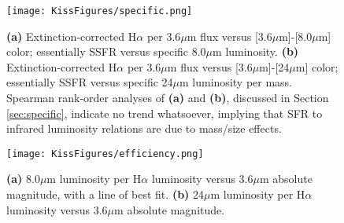 \begin{figure}%
\begin{center}
   \texttt{[image: KissFigures/specific.png]}
   \label{sfr_36micron_ir_36micron}

  \caption{
   {\bf (a)} Extinction-corrected H$\alpha$ per 3.6$\mu$m flux versus [3.6$\mu$m]-[8.0$\mu$m] color; essentially SSFR versus specific 8.0$\mu$m luminosity. 
   {\bf (b)} Extinction-corrected H$\alpha$ per 3.6$\mu$m flux versus [3.6$\mu$m]-[24$\mu$m] color; essentially SSFR versus specific 24$\mu$m luminosity per mass. Spearman rank-order analyses of {\bf(a)} and {\bf(b)}, discussed in Section \ref{sec:specific}, indicate no trend whatsoever, implying that SFR to infrared luminosity relations are due to mass/size effects.}


\label{sfr_36micron_ir_36micron}
\end{center}
\end{figure}

\begin{figure}%
\begin{center}
  \texttt{[image: KissFigures/efficiency.png]}
  \caption{
   {\bf (a)} 8.0$\mu$m luminosity per H$\alpha$ luminosity versus 3.6$\mu$m absolute magnitude, with a line of best fit.
   {\bf (b)} 24$\mu$m luminosity per H$\alpha$ luminosity versus 3.6$\mu$m absolute magnitude.
  }
\label{ir_sfr_36micron}
\end{center}
\end{figure}




